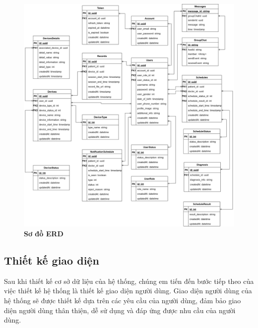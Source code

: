 \begin{figure}[H]
	\centering
	\includegraphics[width=16cm]{Images/System/ERD-db-Page-2.drawio.png}
	\caption[Sơ đồ ERD]{\bfseries \fontsize{12pt}{0pt}\selectfont Sơ đồ ERD}
	\label{fmECG_architecture-Database}
\end{figure}

\subsection{Thiết kế giao diện}
Sau khi thiết kế cơ sở dữ liệu của hệ thống, chúng em tiến đến bước tiếp theo của việc thiết kế hệ thống là thiết kế giao diện người dùng. Giao diện người dùng của hệ thống sẽ được thiết kế dựa trên các yêu cầu của người dùng, đảm bảo giao diện người dùng thân thiện, dễ sử dụng và đáp ứng được nhu cầu của người dùng.
